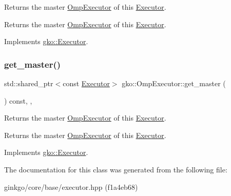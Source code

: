 Returns the master \hyperlink{classgko_1_1OmpExecutor}{Omp\+Executor} of this \hyperlink{classgko_1_1Executor}{Executor}. 

\begin{DoxyReturn}{Returns}
the master \hyperlink{classgko_1_1OmpExecutor}{Omp\+Executor} of this \hyperlink{classgko_1_1Executor}{Executor}. 
\end{DoxyReturn}


Implements \hyperlink{classgko_1_1Executor_acaec4f999d52fc71e5e5a3d3ad93609c}{gko\+::\+Executor}.

\mbox{\label{classgko_1_1OmpExecutor_ab297a7eba78463784d4d2ca08b03c675}} 
\subsubsection{\texorpdfstring{get\+\_\+master()}{get\_master()}\hspace{0.1cm}{\footnotesize\ttfamily [2/2]}}
{\footnotesize\ttfamily std\+::shared\+\_\+ptr$<$const \hyperlink{classgko_1_1Executor}{Executor}$>$ gko\+::\+Omp\+Executor\+::get\+\_\+master (\begin{DoxyParamCaption}{ }\end{DoxyParamCaption}) const\hspace{0.3cm}{\ttfamily [override]}, {\ttfamily [virtual]}, {\ttfamily [noexcept]}}



Returns the master \hyperlink{classgko_1_1OmpExecutor}{Omp\+Executor} of this \hyperlink{classgko_1_1Executor}{Executor}. 

\begin{DoxyReturn}{Returns}
the master \hyperlink{classgko_1_1OmpExecutor}{Omp\+Executor} of this \hyperlink{classgko_1_1Executor}{Executor}. 
\end{DoxyReturn}


Implements \hyperlink{classgko_1_1Executor_a261386e439c8daa6e0d95dc331b9bfeb}{gko\+::\+Executor}.



The documentation for this class was generated from the following file\+:\begin{DoxyCompactItemize}
\item 
ginkgo/core/base/executor.\+hpp (f1a4eb68)\end{DoxyCompactItemize}
